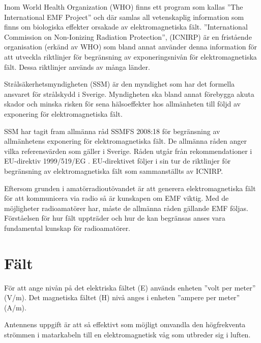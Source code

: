 Inom World Health Organization (WHO) finns ett program som kallas
''The International EMF Project'' och där samlas all vetenskaplig
information som finns om biologiska effekter orsakade av elektromagnetiska fält.
''International Commission on Non-Ionizing Radiation Protection'', (ICNIRP)
är en fristående organisation (erkänd av WHO) som bland annat använder denna
information för att utveckla riktlinjer för begränsning av exponeringsnivån för
elektromagnetiska fält.
Dessa riktlinjer används av många länder.

Strålsäkerhetsmyndigheten (SSM) är den myndighet som har det formella ansvaret
för strålskydd i Sverige.
Myndigheten ska bland annat förebygga akuta skador och minska risken för sena
hälsoeffekter hos allmänheten till följd av exponering för elektromagnetiska
fält.

SSM har tagit fram allmänna råd SSMFS 2008:18 \cite{SSMFS2008:18} för
begränsning av allmänhetens exponering för elektromagnetiska fält.
De allmänna råden anger vilka referensvärden som gäller i Sverige.
Råden utgår från rekommendationer i EU-direktiv 1999/519/EG \cite{1999/519/EG}.
EU-direktivet följer i sin tur de riktlinjer för begränsning av
elektromagnetiska fält som sammanställts av ICNIRP.

Eftersom grunden i amatörradioutövandet är att generera elektromagnetiska fält
för att kommunicera via radio så är kunskapen om EMF viktig.
Med de möjligheter radioamatörer har, måste de allmänna råden gällande EMF
följas.
Förståelsen för hur fält uppträder och hur de kan begränsas anses vara
fundamental kunskap för radioamatörer.

\section{Fält}
För att ange nivån på det elektriska fältet (E) används enheten
''volt per meter'' (V/m).
Det magnetiska fältet (H) nivå anges i enheten ''ampere per meter'' (A/m).

Antennens uppgift är att så effektivt som möjligt omvandla den högfrekventa
strömmen i matarkabeln till en elektromagnetisk våg som utbreder sig i luften.

